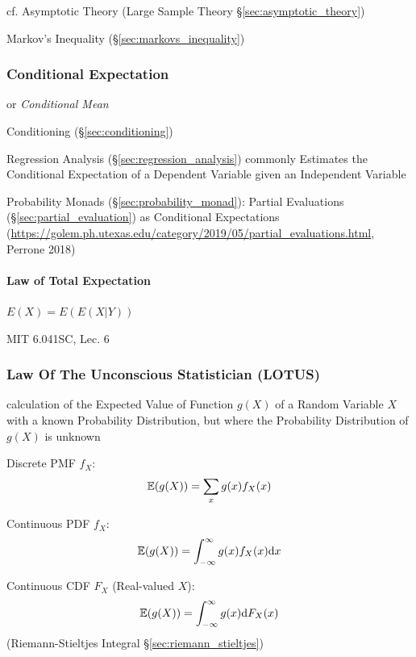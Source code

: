 \fist cf. Asymptotic Theory (Large Sample Theory \S\ref{sec:asymptotic_theory})

Markov's Inequality (\S\ref{sec:markovs_inequality})



\subsubsection{Conditional Expectation}\label{sec:conditional_expectation}

or \emph{Conditional Mean}

\fist Conditioning (\S\ref{sec:conditioning})

\fist Regression Analysis (\S\ref{sec:regression_analysis}) commonly Estimates
the Conditional Expectation of a Dependent Variable given an Independent
Variable

\fist Probability Monads (\S\ref{sec:probability_monad}): Partial Evaluations
(\S\ref{sec:partial_evaluation}) as Conditional Expectations
(\url{https://golem.ph.utexas.edu/category/2019/05/partial_evaluations.html},
Perrone 2018)



\paragraph{Law of Total Expectation}\label{sec:total_expectation}\hfill

$E(X) = E(E(X | Y))$

MIT 6.041SC, Lec. 6



\subsubsection{Law Of The Unconscious Statistician (LOTUS)}\label{sec:lotus}

calculation of the Expected Value of Function $g(X)$ of a Random Variable $X$
with a known Probability Distribution, but where the Probability Distribution of
$g(X)$ is unknown

Discrete PMF $f_X$:
\[
  \mathbb{E}(g(X)) = \sum_x g(x) f_X(x)
\]

Continuous PDF $f_X$:
\[
  \mathbb{E}(g(X)) = \int_{-\infty}^\infty g(x) f_X(x) \mathrm{d}x
\]

Continuous CDF $F_X$ (Real-valued $X$):
\[
  \mathbb{E}(g(X)) = \int_{-\infty}^\infty g(x) \mathrm{d}F_X(x)
\]
(Riemann-Stieltjes Integral \S\ref{sec:riemann_stieltjes})



